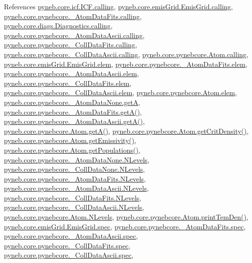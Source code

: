 References \hyperlink{icf_8py_source_l00016}{pyneb.\+core.\+icf.\+I\+C\+F.\+calling}, \hyperlink{emis_grid_8py_source_l00041}{pyneb.\+core.\+emis\+Grid.\+Emis\+Grid.\+calling}, \hyperlink{pynebcore_8py_source_l00090}{pyneb.\+core.\+pynebcore.\+\_\+\+Atom\+Data\+Fits.\+calling}, \hyperlink{diags_8py_source_l00169}{pyneb.\+core.\+diags.\+Diagnostics.\+calling}, \hyperlink{pynebcore_8py_source_l00311}{pyneb.\+core.\+pynebcore.\+\_\+\+Atom\+Data\+Ascii.\+calling}, \hyperlink{pynebcore_8py_source_l00568}{pyneb.\+core.\+pynebcore.\+\_\+\+Coll\+Data\+Fits.\+calling}, \hyperlink{pynebcore_8py_source_l00918}{pyneb.\+core.\+pynebcore.\+\_\+\+Coll\+Data\+Ascii.\+calling}, \hyperlink{pynebcore_8py_source_l01175}{pyneb.\+core.\+pynebcore.\+Atom.\+calling}, \hyperlink{emis_grid_8py_source_l00045}{pyneb.\+core.\+emis\+Grid.\+Emis\+Grid.\+elem}, \hyperlink{pynebcore_8py_source_l00083}{pyneb.\+core.\+pynebcore.\+\_\+\+Atom\+Data\+Fits.\+elem}, \hyperlink{pynebcore_8py_source_l00304}{pyneb.\+core.\+pynebcore.\+\_\+\+Atom\+Data\+Ascii.\+elem}, \hyperlink{pynebcore_8py_source_l00560}{pyneb.\+core.\+pynebcore.\+\_\+\+Coll\+Data\+Fits.\+elem}, \hyperlink{pynebcore_8py_source_l00910}{pyneb.\+core.\+pynebcore.\+\_\+\+Coll\+Data\+Ascii.\+elem}, \hyperlink{pynebcore_8py_source_l01165}{pyneb.\+core.\+pynebcore.\+Atom.\+elem}, \hyperlink{pynebcore_8py_source_l00060}{pyneb.\+core.\+pynebcore.\+\_\+\+Atom\+Data\+None.\+get\+A}, \hyperlink{pynebcore_8py_source_l00205}{pyneb.\+core.\+pynebcore.\+\_\+\+Atom\+Data\+Fits.\+get\+A()}, \hyperlink{pynebcore_8py_source_l00475}{pyneb.\+core.\+pynebcore.\+\_\+\+Atom\+Data\+Ascii.\+get\+A()}, \hyperlink{pynebcore_8py_source_l01471}{pyneb.\+core.\+pynebcore.\+Atom.\+get\+A()}, \hyperlink{pynebcore_8py_source_l01693}{pyneb.\+core.\+pynebcore.\+Atom.\+get\+Crit\+Density()}, \hyperlink{pynebcore_8py_source_l01716}{pyneb.\+core.\+pynebcore.\+Atom.\+get\+Emissivity()}, \hyperlink{pynebcore_8py_source_l01496}{pyneb.\+core.\+pynebcore.\+Atom.\+get\+Populations()}, \hyperlink{pynebcore_8py_source_l00062}{pyneb.\+core.\+pynebcore.\+\_\+\+Atom\+Data\+None.\+N\+Levels}, \hyperlink{pynebcore_8py_source_l00075}{pyneb.\+core.\+pynebcore.\+\_\+\+Coll\+Data\+None.\+N\+Levels}, \hyperlink{pynebcore_8py_source_l00155}{pyneb.\+core.\+pynebcore.\+\_\+\+Atom\+Data\+Fits.\+N\+Levels}, \hyperlink{pynebcore_8py_source_l00404}{pyneb.\+core.\+pynebcore.\+\_\+\+Atom\+Data\+Ascii.\+N\+Levels}, \hyperlink{pynebcore_8py_source_l00637}{pyneb.\+core.\+pynebcore.\+\_\+\+Coll\+Data\+Fits.\+N\+Levels}, \hyperlink{pynebcore_8py_source_l00984}{pyneb.\+core.\+pynebcore.\+\_\+\+Coll\+Data\+Ascii.\+N\+Levels}, \hyperlink{pynebcore_8py_source_l01260}{pyneb.\+core.\+pynebcore.\+Atom.\+N\+Levels}, \hyperlink{pynebcore_8py_source_l02253}{pyneb.\+core.\+pynebcore.\+Atom.\+print\+Tem\+Den()}, \hyperlink{emis_grid_8py_source_l00046}{pyneb.\+core.\+emis\+Grid.\+Emis\+Grid.\+spec}, \hyperlink{pynebcore_8py_source_l00084}{pyneb.\+core.\+pynebcore.\+\_\+\+Atom\+Data\+Fits.\+spec}, \hyperlink{pynebcore_8py_source_l00305}{pyneb.\+core.\+pynebcore.\+\_\+\+Atom\+Data\+Ascii.\+spec}, \hyperlink{pynebcore_8py_source_l00561}{pyneb.\+core.\+pynebcore.\+\_\+\+Coll\+Data\+Fits.\+spec}, \hyperlink{pynebcore_8py_source_l00911}{pyneb.\+core.\+pynebcore.\+\_\+\+Coll\+Data\+Ascii.\+spec}, 